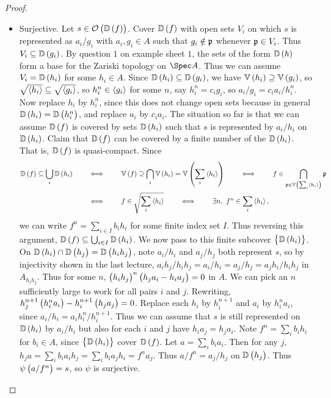 \begin{proof}
\begin{itemize}
\item Surjective. Let $ s \in \OOO\br{\DD\br{f}} $. Cover $ \DD\br{f} $ with open sets $ V_i $ on which $ s $ is represented as $ a_i / g_i $ with $ a_i, g_i \in A $ such that $ g_i \notin \mathfrak{p} $ whenever $ \mathfrak{p} \in V_i $. Thus $ V_i \subseteq \DD\br{g_i} $. By question $ 1 $ on example sheet $ 1 $, the sets of the form $ \DD\br{h} $ form a base for the Zariski topology on $ \Spec A $. Thus we can assume $ V_i = \DD\br{h_i} $ for some $ h_i \in A $. Since $ \DD\br{h_i} \subseteq \DD\br{g_i} $, we have $ \VV\br{h_i} \supseteq \VV\br{g_i} $, so $ \sqrt{\left\langle h_i \right\rangle} \subseteq \sqrt{\left\langle g_i \right\rangle} $, so $ h_i^n \in \left\langle g_i \right\rangle $ for some $ n $, say $ h_i^n = c_ig_i $, so $ a_i / g_i = c_ia_i / h_i^n $. Now replace $ h_i $ by $ h_i^n $, since this does not change open sets because in general $ \DD\br{h_i} = \DD\br{h_i^n} $, and replace $ a_i $ by $ c_ia_i $. The situation so far is that we can assume $ \DD\br{f} $ is covered by sets $ \DD\br{h_i} $ such that $ s $ is represented by $ a_i / h_i $ on $ \DD\br{h_i} $. Claim that $ \DD\br{f} $ can be covered by a finite number of the $ \DD\br{h_i} $. That is, $ \DD\br{f} $ is quasi-compact. Since
\begin{align*}
\DD\br{f} \subseteq \bigcup_i \DD\br{h_i} \qquad
& \iff \qquad \VV\br{f} \supseteq \bigcap_i \VV\br{h_i} = \VV\br{\sum_i \abr{h_i}}
\qquad \iff \qquad f \in \bigcap_{\ppp \in \VV\br{\sum_i \abr{h_i}}} \ppp \\
& \iff \qquad f \in \sqrt{\sum_i \abr{h_i}}
\qquad \iff \qquad \exists n, \ f^n \in \sum_i \abr{h_i},
\end{align*}
we can write $ f^n = \sum_{i \in I} b_ih_i $ for some finite index set $ I $. Thus reversing this argument, $ \DD\br{f} \subseteq \bigcup_{i \in I} \DD\br{h_i} $. We now pass to this finite subcover $ \cbr{\DD\br{h_i}} $. On $ \DD\br{h_i} \cap \DD\br{h_j} = \DD\br{h_ih_j} $, note $ a_i / h_i $ and $ a_j / h_j $ both represent $ s $, so by injectivity shown in the last lecture, $ a_ih_j / h_ih_j = a_i / h_i = a_j / h_j = a_jh_i / h_ih_j $ in $ A_{h_ih_j} $. Thus for some $ n $, $ \br{h_ih_j}^n\br{h_ja_i - h_ia_j} = 0 $ in $ A $. We can pick an $ n $ sufficiently large to work for all pairs $ i $ and $ j $. Rewriting, $ h_j^{n + 1}\br{h_i^na_i} - h_i^{n + 1}\br{h_ja_j} = 0 $. Replace each $ h_i $ by $ h_i^{n + 1} $ and $ a_i $ by $ h_i^na_i $, since $ a_i / h_i = a_ih_i^n / h_i^{n + 1} $. Thus we can assume that $ s $ is still represented on $ \DD\br{h_i} $ by $ a_i / h_i $ but also for each $ i $ and $ j $ have $ h_ia_j = h_ja_i $. Note $ f^n = \sum_ib_ih_i $ for $ b_i \in A $, since $ \cbr{\DD\br{h_i}} $ cover $ \DD\br{f} $. Let $ a = \sum_i b_ia_i $. Then for any $ j $, $ h_ja = \sum_i b_ia_ih_j = \sum_i b_ia_jh_i = f^na_j $. Thus $ a / f^n = a_j / h_j $ on $ \DD\br{h_j} $. Thus $ \psi\br{a / f^n} = s $, so $ \psi $ is surjective.
\end{itemize}
\end{proof}

